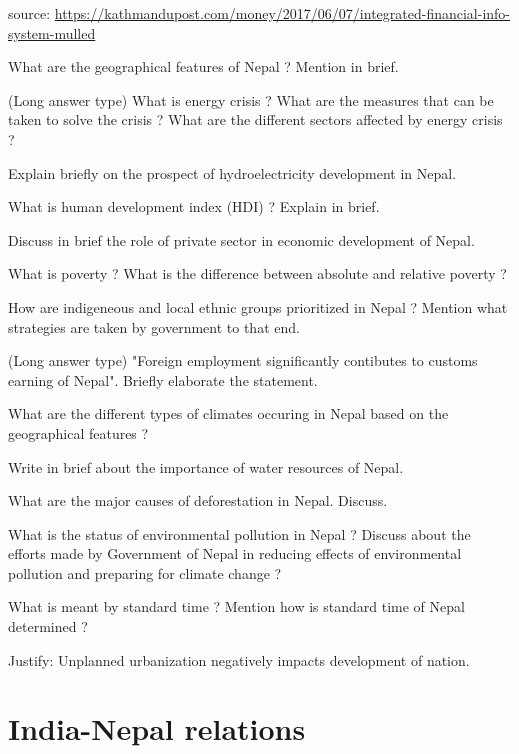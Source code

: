 \documentclass[
  openany]{book}
\newcommand{\question}{\item}
\begin{document}
\begin{questions}
source: \url{https://kathmandupost.com/money/2017/06/07/integrated-financial-info-system-mulled}

\question What are the geographical features of Nepal ? Mention in brief.


\question (Long answer type) What is energy crisis ? What are the measures that can be taken to solve the crisis ? What are the different sectors affected by energy crisis ?

\question Explain briefly on the prospect of hydroelectricity development in Nepal.

\question What is human development index (HDI) ? Explain in brief.

\question Discuss in brief the role of private sector in economic development of Nepal. 

\question What is poverty ? What is the difference between absolute and relative poverty ?

\question How are indigeneous and local ethnic groups prioritized in Nepal ? Mention what strategies are taken by government to that end.

\question (Long answer type) "Foreign employment significantly contibutes to customs earning of Nepal". Briefly elaborate the statement.

\question What are the different types of climates occuring in Nepal based on the geographical features ?

\question Write in brief about the importance of water resources of Nepal.

\question What are the major causes of deforestation in Nepal. Discuss.

\question What is the status of environmental pollution in Nepal ? Discuss about the efforts made by Government of Nepal in reducing effects of environmental pollution and preparing for climate change ?

\question What is meant by standard time ? Mention how is standard time of Nepal determined ?

\question Justify: Unplanned urbanization negatively impacts development of nation.

\end{questions}

\hypertarget{india-nepal-relations}{%
\section{India-Nepal relations}\label{india-nepal-relations}}
\end{document}
